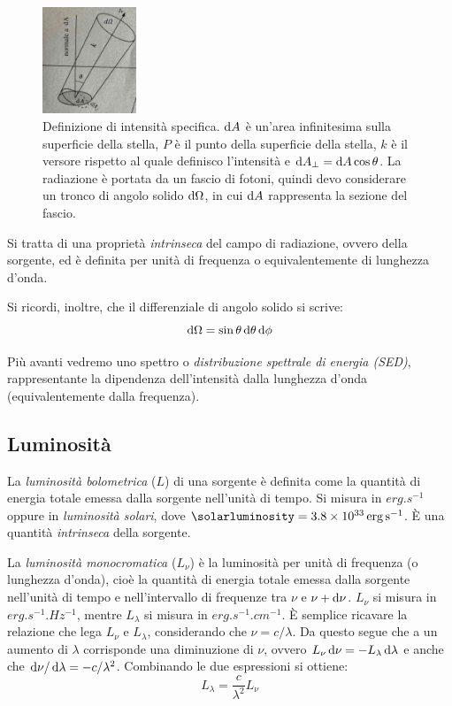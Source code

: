 \begin{figure}
\centering
\includegraphics[width=0.25\textwidth]{immagini/intensita-specifica.jpg}
\caption{Definizione di intensità specifica. $\mathop{\mathrm{{}d}}\mathopen{} A$ è un'area infinitesima sulla superficie della stella, $P$ è il punto della superficie della stella, $k$ è il versore rispetto al quale definisco l'intensità e $\mathop{\mathrm{{}d}}\mathopen{} A_\perp = \mathop{\mathrm{{}d}}\mathopen{} A \cos{\theta}$. La radiazione è portata da un fascio di fotoni, quindi devo considerare un tronco di angolo solido $\mathop{\mathrm{{}d}}\mathopen{} \Omega$, in cui $\mathop{\mathrm{{}d}}\mathopen{} A$ rappresenta la sezione del fascio.}
\label{fig:intensità-specifica}
\end{figure}

Si tratta di una proprietà \emph{intrinseca} del campo di radiazione, ovvero della sorgente, ed è definita per unità di frequenza o equivalentemente di lunghezza d'onda.

Si ricordi, inoltre, che il differenziale di angolo solido si scrive:
\begin{equation}\label{eq:angolo-solido}
    \mathop{\mathrm{{}d}}\mathopen{} \Omega = \sin{\theta} \mathop{\mathrm{{}d}}\mathopen{} \theta \mathop{\mathrm{{}d}}\mathopen{} \phi
\end{equation}

Più avanti vedremo uno spettro o \emph{distribuzione spettrale di energia (SED)}, rappresentante la dipendenza dell'intensità dalla lunghezza d'onda (equivalentemente dalla frequenza). 

\subsection{Luminosità}\label{sec:luminosità}
La \emph{luminosità bolometrica} ($L$) di una sorgente è definita come la quantità di energia totale emessa dalla sorgente nell'unità di tempo. Si misura in $\si{erg.s^{-1}}$ oppure in \emph{luminosità solari}, dove $\si{\solarluminosity} = \SI{3.8e33}{erg.s^{-1}}$. È una quantità \emph{intrinseca} della sorgente.

La \emph{luminosità monocromatica} ($L_\nu$) è la luminosità per unità di frequenza (o lunghezza d'onda), cioè la quantità di energia totale emessa dalla sorgente nell'unità di tempo e nell'intervallo di frequenze tra $\nu$ e $\nu + \mathop{\mathrm{{}d}}\mathopen{} \nu$. $L_\nu$ si misura in $\si{erg.s^{-1}.Hz^{-1}}$, mentre $L_\lambda$ si misura in $\si{erg.s^{-1}.cm^{-1}}$. È semplice ricavare la relazione che lega $L_\nu$ e $L_\lambda$, considerando che $\nu = c / \lambda$. Da questo segue che a un aumento di $\lambda$ corrisponde una diminuzione di $\nu$, ovvero $L_\nu \mathop{\mathrm{{}d}}\mathopen{} \nu = - L_\lambda \mathop{\mathrm{{}d}}\mathopen{} \lambda$ e anche che $\mathop{\mathrm{{}d}}\mathopen{} \nu / \mathop{\mathrm{{}d}}\mathopen{} \lambda = - c / \lambda^2$. Combinando le due espressioni si ottiene:
\begin{equation}\label{eq:luminosità-monocromatica}
    L_\lambda = \frac{c}{\lambda^2} L_\nu
\end{equation}

